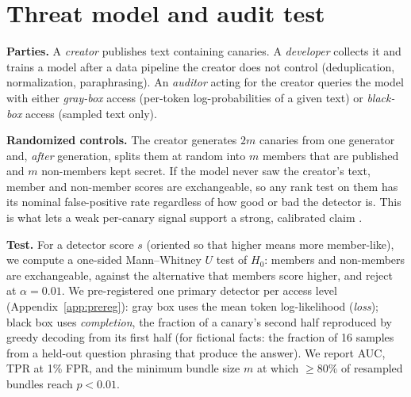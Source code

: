 \section{Threat model and audit test}\label{sec:threat}
\textbf{Parties.} A \emph{creator} publishes text containing canaries. A \emph{developer} collects it and trains a
model after a data pipeline the creator does not control (deduplication, normalization, paraphrasing). An
\emph{auditor} acting for the creator queries the model with either \emph{gray-box} access (per-token
log-probabilities of a given text) or \emph{black-box} access (sampled text only).

\textbf{Randomized controls.} The creator generates $2m$ canaries from one generator and, \emph{after} generation,
splits them at random into $m$ members that are published and $m$ non-members kept secret. If the model never saw
the creator's text, member and non-member scores are exchangeable, so any rank test on them has its nominal
false-positive rate regardless of how good or bad the detector is. This is what lets a weak per-canary signal
support a strong, calibrated claim \citep{zhang2024membership}.

\textbf{Test.} For a detector score $s$ (oriented so that higher means more member-like), we compute a one-sided
Mann--Whitney $U$ test of $H_0$: members and non-members are exchangeable, against the alternative that members
score higher, and reject at $\alpha=0.01$. We pre-registered one primary detector per access level
(Appendix~\ref{app:prereg}): gray box uses the mean token log-likelihood (\emph{loss}); black box uses
\emph{completion}, the fraction of a canary's second half reproduced by greedy decoding from its first half (for
fictional facts: the fraction of 16 samples from a held-out question phrasing that produce the answer). We report
AUC, TPR at 1\% FPR, and the minimum bundle size $m$ at which $\ge 80\%$ of resampled bundles reach $p<0.01$.
